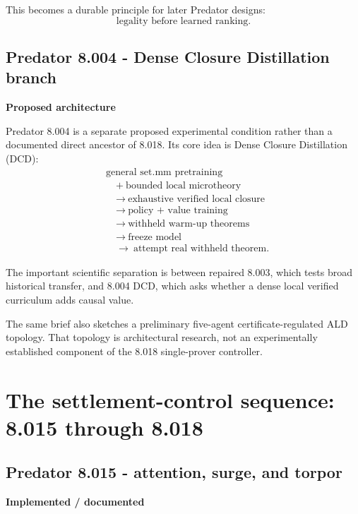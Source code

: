 \documentclass[11pt]{article}
\newcommand{\implemented}{\textbf{Implemented / documented}}
\newcommand{\proposed}{\textbf{Proposed architecture}}
\begin{document}
This becomes a durable principle for later Predator designs:
\[
\boxed{\text{legality before learned ranking}.}
\]

\subsection{Predator 8.004 - Dense Closure Distillation branch}

\begin{statusbox}\proposed\end{statusbox}

Predator 8.004 is a separate proposed experimental condition rather than a documented direct ancestor of 8.018. Its core idea is Dense Closure Distillation (DCD):
\[
\begin{aligned}
&\text{general set.mm pretraining}\\
&\quad +\ \text{bounded local microtheory}\\
&\quad \longrightarrow\ \text{exhaustive verified local closure}\\
&\quad \longrightarrow\ \text{policy + value training}\\
&\quad \longrightarrow\ \text{withheld warm-up theorems}\\
&\quad \longrightarrow\ \text{freeze model}\\
&\quad \longrightarrow\ \text{attempt real withheld theorem}.
\end{aligned}
\]

The important scientific separation is between repaired 8.003, which tests broad historical transfer, and 8.004 DCD, which asks whether a dense local verified curriculum adds causal value.

The same brief also sketches a preliminary five-agent certificate-regulated ALD topology. That topology is architectural research, not an experimentally established component of the 8.018 single-prover controller.

\section{The settlement-control sequence: 8.015 through 8.018}

\subsection{Predator 8.015 - attention, surge, and torpor}

\begin{statusbox}\implemented\end{statusbox}
\end{document}
